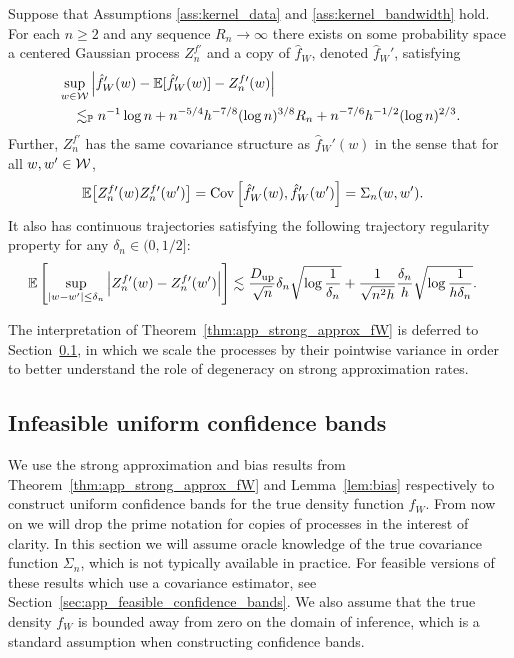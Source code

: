 \begin{theorem}
  \label{thm:app_strong_approx_fW}

  Suppose that Assumptions
  \ref{ass:kernel_data} and \ref{ass:kernel_bandwidth} hold.
  For each $n \geq 2$
  and any sequence $R_n \to \infty$
  there exists on some probability space
  a centered Gaussian process $Z_n^{f\prime}$
  and a copy of $\hat f_W$,
  denoted $\hat f_W'$,
  satisfying
  \begin{align*}
    &\sup_{w \in \mathcal{W}}
    \Big|
    \hat f_W'(w) - \mathbb{E}[\hat f_W'(w)]
    - Z_n^{f\prime}(w)
    \Big| \\
    &\quad\lesssim_{\mathbb{P}}
    n^{-1} \log n
    + n^{-5/4} h^{-7/8} (\log n)^{3/8} R_n
    + n^{-7/6} h^{-1/2} (\log n)^{2/3}.
  \end{align*}
  Further, $Z_n^{f\prime}$ has the same covariance
  structure as
  $\hat f_W'(w)$
  in the sense that for all
  $w, w' \in \mathcal{W}$,
  \begin{align*}
    \mathbb{E}\big[Z_n^{f\prime}(w) Z_n^{f\prime}(w')\big]
    &=
    \operatorname{Cov}\Big[
      \hat f_W'(w),
      \hat f_W'(w')
    \Big]
    = \Sigma_n(w,w').
  \end{align*}
  It also has continuous trajectories satisfying
  the following trajectory regularity property
  for any $\delta_n \in (0, 1/2]$:
  \begin{align*}
    \mathbb{E}\left[
      \sup_{|w-w'| \leq \delta_n}
      \Big|
      Z_n^{f\prime}(w)
      - Z_n^{f\prime}(w')
      \Big|
    \right]
    &\lesssim
    \frac{D_{\textup{up}}}{\sqrt n} \delta_n
    \sqrt{\log \frac{1}{\delta_n}}
    + \frac{1}{\sqrt{n^2h}}
    \frac{\delta_n}{h}
    \sqrt{\log \frac{1}{h\delta_n}}.
  \end{align*}
\end{theorem}

\begin{remark}
  The interpretation of
  Theorem~\ref{thm:app_strong_approx_fW}
  is deferred to
  Section~\ref{sec:infeasible_confidence_bands},
  in which we scale the processes by their pointwise variance
  in order to better understand the role of degeneracy
  on strong approximation rates.
\end{remark}

\subsection{Infeasible uniform confidence bands}
\label{sec:infeasible_confidence_bands}

We use the strong approximation and bias results
from Theorem~\ref{thm:app_strong_approx_fW}
and Lemma~\ref{lem:bias}
respectively to construct uniform confidence bands for
the true density function $f_W$.
From now on we will drop the prime notation for copies of processes
in the interest of clarity.
In this section we will assume oracle knowledge of the true
covariance function $\Sigma_n$,
which is not typically available in practice.
For feasible versions of these results which use a covariance estimator,
see Section~\ref{sec:app_feasible_confidence_bands}.
We also assume that the true density $f_W$
is bounded away from zero on the domain of inference,
which is a standard assumption when constructing confidence bands.

